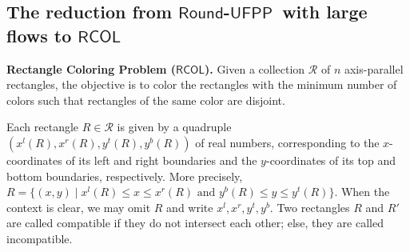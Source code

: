 \documentclass[a4paper,UKenglish]{lipics-v2016}
\newcommand{\rufpp}{\mbox{$\mathsf{Round}$-$\mathsf{UFPP}$}}
\newcommand{\rcol}{\mbox{$\mathsf{RCOL}$}}
\theoremstyle{plain}
\newcommand{\cR}{\mathcal{R}}
\begin{document}

\subsection{The reduction from \rufpp\ with large flows to \rcol}
\label{subsec: The reduction}
\begin{definition}
{\bf Rectangle Coloring Problem (\rcol).}
Given a collection $\cR$ of $n$ axis-parallel rectangles, the objective is to color the rectangles with the minimum number of colors such that rectangles of the same color are disjoint.
\end{definition}

Each rectangle $R\in\cR$ is given by a quadruple $(x^l(R), x^r(R), y^t(R), y^b(R))$ of real numbers, corresponding to the $x$-coordinates of its left and right boundaries and the $y$-coordinates of its top and bottom boundaries, respectively. More precisely,
$R = \{ (x,y) \mid  x^l(R) \leq  x \leq x^r(R) \mbox{ and } y^b(R) \leq y \leq y^t(R)\}$. When the context is clear, we may omit $R$ and write $x^l, x^r, y^t, y^b$. Two rectangles $R$ and $R'$ are called compatible if they do not intersect each other; else, they are called incompatible.
\end{document}
